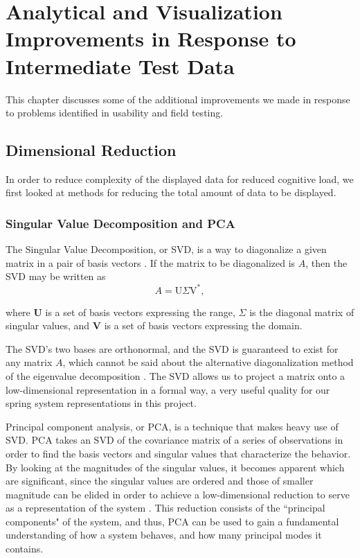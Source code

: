 
\chapter{Analytical and Visualization Improvements in Response to Intermediate Test Data}

This chapter discusses some of the additional improvements we made in response to problems identified in usability and field testing.

\section{Dimensional Reduction}

In order to reduce complexity of the displayed data for reduced cognitive load, we first looked at methods for reducing the total amount of data to be displayed.

\subsection{Singular Value Decomposition and PCA}

The Singular Value Decomposition, or SVD, is a way to diagonalize a given matrix in a pair of basis vectors \cite{kutz2013data}. If the matrix to be diagonalized is $A$, then the SVD may be written as
\begin{equation} \label{eq:svd}
A = \text{U} \Sigma \text{V}^{*},
\end{equation}

where \textbf{U} is a set of basis vectors expressing the range, $\Sigma$ is the diagonal matrix of singular values, and \textbf{V} is a set of basis vectors expressing the domain.

The SVD's two bases are orthonormal, and the SVD is guaranteed to exist for any matrix $A$, which cannot be said about the alternative diagonalization method of the eigenvalue decomposition \cite{kutz2013data}. The SVD allows us to project a matrix onto a low-dimensional representation in a formal way, a very useful quality for our spring system representations in this project.

Principal component analysis, or PCA, is a technique that makes heavy use of SVD. PCA takes an SVD of the covariance matrix of a series of observations in order to find the basis vectors and singular values that characterize the behavior. By looking at the magnitudes of the singular values, it becomes apparent which are significant, since the singular values are ordered and those of smaller magnitude can be elided in order to achieve a low-dimensional reduction to serve as a representation of the system \cite{kutz2013data}. This reduction consists of the ``principal components" of the system, and thus, PCA can be used to gain a fundamental understanding of how a system behaves, and how many principal modes it contains.

